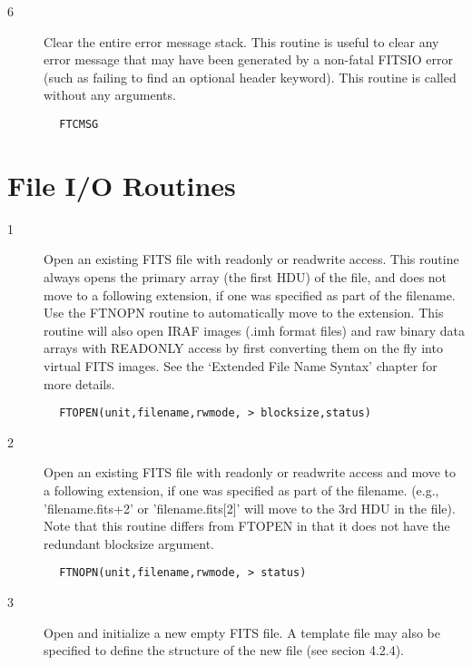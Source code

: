 \documentclass[11pt]{book}
\begin{document}
\begin{description}
\item[6 ]  Clear the entire error message stack.  This routine is useful
     to clear any error message that may have been generated by
     a non-fatal FITSIO error (such as failing to find an optional
    header keyword).  This routine is called without any arguments.
\end{description}

\begin{verbatim}
        FTCMSG
\end{verbatim}


\section{File I/O Routines}


\begin{description}
\item[1 ]Open an existing FITS file with readonly or readwrite access.
   This routine always opens the primary array (the first HDU) of
   the file, and does not move to a following extension, if one was
   specified as part of the filename.   Use the FTNOPN routine to
   automatically move to the extension.  This routine will also
   open IRAF images (.imh format files) and raw binary data arrays
   with READONLY access by first converting them on the fly into
   virtual FITS images.  See the `Extended File Name Syntax' chapter
  for more details.
\end{description}

\begin{verbatim}
        FTOPEN(unit,filename,rwmode, > blocksize,status)
\end{verbatim}

\begin{description}
\item[2 ]Open an existing FITS file with readonly or readwrite access
   and move to a following extension, if one was specified as
   part of the filename.  (e.g.,  'filename.fits+2' or
   'filename.fits[2]' will move to the 3rd HDU in the file).
   Note that this routine differs from FTOPEN in that it does not
  have the redundant blocksize argument.
\end{description}

\begin{verbatim}
        FTNOPN(unit,filename,rwmode, > status)
\end{verbatim}

\begin{description}
\item[3 ]Open and initialize a new empty FITS file.   A template file may also be
   specified to define the structure of the new file (see secion 4.2.4).
\end{description}
\end{document}
